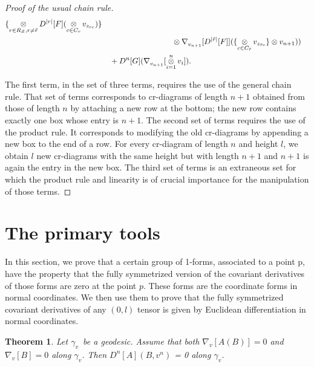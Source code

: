\documentclass[11pt]{article}
\newtheorem{theorem}{Theorem}
\theoremstyle{remark}
\begin{document}
\begin{proof}[Proof of the usual chain rule]
\begin{align*}
 \{\mathop{\otimes}_{r \in R_{\ensuremath{Z}}, r\neq \tilde r} 
\ensuremath{D^{|r|} [{F}] {} }
(\mathop{\otimes}_{c \in C_{r}} v_{\ensuremath{z}_{rc}} ) \} 
\\& \hspace{1.25in}\otimes
\ensuremath{{{\nabla}}_{v_{n+1}}^{}{[  
\ensuremath{D^{|\tilde r|} [{F}] {} }]}}
(\{\mathop{\otimes}_{c \in C_{\tilde r}} 
v_{\ensuremath{z}_{\tilde rc}}\} \otimes v_{n+1}) ) \\
&\quad+
\ensuremath{D^{n} [{G}] ({\ensuremath{{{\nabla}}_{v_{n+1}}^{}{[\mathop{\otimes}_{i=1}^n v_i]}}}) }.
\end{align*}

The first term, in the set of three terms, requires the use of the
general chain rule.  That set of terms 
 corresponds to cr-diagrams of length $n+1$
obtained from those of length $n$ by attaching a new row at the
bottom; the new row 
contains exactly 
one box whose entry is $n+1$. The second set of terms requires the use
of the product
rule. It corresponds to modifying the old cr-diagrams by appending a
new box to the end of a row. For every cr-diagram of length $n$ and
height $l$, we obtain $l$ new cr-diagrams with the same height but
with length $n+1$ and $n+1$ is again the entry in the new box. The
third set of terms is an extraneous set for which the product rule and
linearity is of crucial importance for the manipulation of those
terms. 
\end{proof}


\section{The primary tools} \label{s:key}

In this section, we prove that a certain group of 1-forms, associated
to a point p, have the property that the fully symmetrized version of the
covariant derivatives of those forms are 
zero at the point $p$. These forms  are the
coordinate forms in normal coordinates. We then use them to prove that
the fully symmetrized covariant derivatives of any $(0,l)$ tensor is
given by Euclidean differentiation in normal coordinates.

\begin{theorem}\label{tt:key}
Let \ensuremath{\gamma_v}\ be a geodesic. Assume that both $\ensuremath{{{\nabla}}_{v}^{}{[A(B)]}}=
0$ and $\ensuremath{{{\nabla}}_{v}^{}{[B]}} = 0$ along
\ensuremath{\gamma_v}. Then \ensuremath{D^{n} [{A}] ({B, v^n}) } = 0  along \ensuremath{\gamma_v}.    
\end{theorem}
\end{document}

